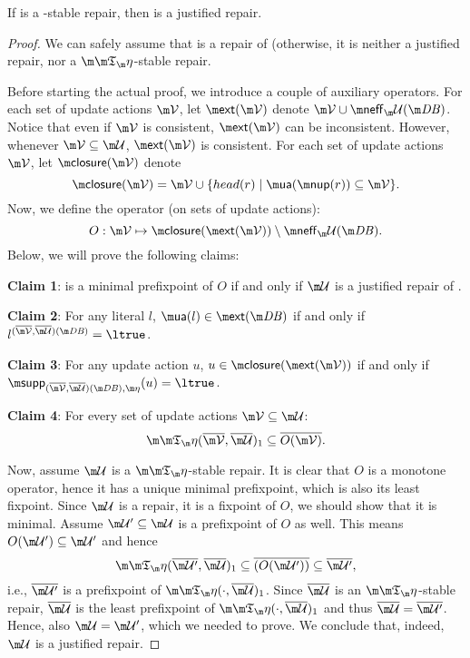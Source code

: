 \begin{proposition}\label{prop:stable_is_justified}
If \UU is a \Ap-stable repair, then \UU is a justified repair. 
\end{proposition}
\begin{proof}
We can safely assume that \UU is a repair of \db (otherwise, it is neither a justified repair, nor a $\Ap$-stable repair.


 Before starting the actual proof, we introduce a couple of auxiliary operators. 
 For each set of update actions $\VV$, let $\ext(\VV)$ denote $\VV\cup \neff_\UU(\db)$.
 Notice that even if $\VV$ is consistent, $\ext(\VV)$ can be inconsistent. 
 However, whenever $\VV \subseteq \UU$, $\ext(\VV)$ is consistent. 
 For each set of update actions $\VV$, let $\closure(\VV)$ denote \[\closure(\VV)= \VV\cup \{head(r) \mid \actof(\nup(r)) \subseteq \VV\}.\] 
 Now, we define the operator (on sets of update actions):
\[O: \VV \mapsto \closure(\ext(\VV)) \setminus \neff_\UU(\db).\]
Below, we will prove the following claims:
\begin{compactdesc}
 \item \textbf{Claim 1}: \UU is a minimal prefixpoint of $O$ if and only if $\UU$ is a justified repair of \fulldb. 
 \item \textbf{Claim 2}: For any literal $l$, $\actof(l)\in \ext(\db)$ if and only if $l^{(\overline \VV, \overline \UU)(\db)} = \ltrue$. 
 \item \textbf{Claim 3}: For any update action $u$, $u\in \closure(\ext(\VV))$ if and only if  $\supp_{(\overline\VV,\overline\UU)(\db),\aics}(u) = \ltrue$. 
 \item \textbf{Claim 4}: For every set of update actions $\VV\subseteq \UU$: 
 \[\Ap(\overline\VV,\overline\UU)_1\subseteq \overline{O(\VV)}.\] 
\end{compactdesc}
Now, assume $\UU$ is a $\Ap$-stable repair. It is clear that $O$ is a monotone operator, hence it has a unique minimal prefixpoint, which is also its least fixpoint. Since $\UU$ is a repair, it is a fixpoint of $O$, we should show that it is minimal. Assume $\UU'\subseteq \UU$ is a prefixpoint of $O$ as well. This means $O(\UU')\subseteq \UU'$ 
and hence 
\[\Ap(\overline{\UU'},\overline\UU)_1 \subseteq \overline{(O(\UU'))}\subseteq \overline{\UU'},\]
i.e., $\overline{\UU'}$ is a prefixpoint of $\Ap(\cdot,\overline\UU)_1$. 
Since $\overline\UU$ is an $\Ap$-stable repair, $\overline\UU$ is the least prefixpoint of $\Ap(\cdot,\overline\UU)_1$ and thus $\overline\UU = \overline{\UU'}$. Hence, also $\UU=\UU'$, which we needed to prove. We conclude that, indeed, $\UU$ is a justified repair. 



\end{proof}
